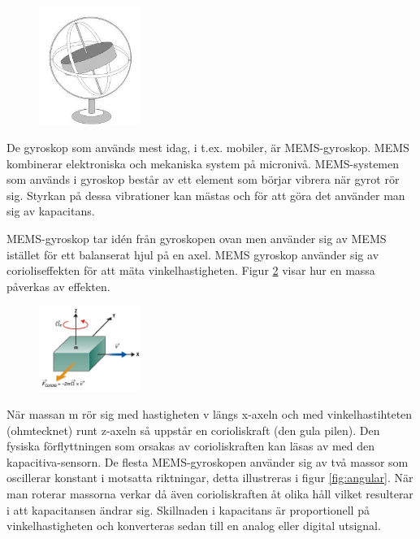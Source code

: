 \documentclass[a4paper,12pt,fleqn]{article}
\begin{document}
\begin{figure}[h]
\label{fig:gyro}
\caption{}
\includegraphics[width=0.3\textwidth]
{gyro.jpeg}
\end{figure}

De gyroskop som används mest idag, i t.ex. mobiler, är MEMS-gyroskop. MEMS kombinerar elektroniska och mekaniska system på micronivå. MEMS-systemen som används i gyroskop består av ett element som börjar vibrera när gyrot rör sig. Styrkan på dessa vibrationer kan mästas och för att göra det använder man sig av kapacitans.

MEMS-gyroskop tar idén från gyroskopen ovan men använder sig av MEMS istället för ett balanserat hjul på en axel. MEMS gyroskop använder sig av corioliseffekten för att mäta vinkelhastigheten. Figur \ref{fig:coriolis} visar hur en massa påverkas av effekten.
\begin{figure}[h]
\label{fig:coriolis}
\caption{}
\includegraphics[width=0.3\textwidth]
{coriolis.png}
\end{figure}


När massan m rör sig med hastigheten v längs x-axeln och med vinkelhastihteten (ohmtecknet) runt z-axeln så uppstår en corioliskraft (den gula pilen). Den fysiska förflyttningen som orsakas av corioliskraften kan läsas av med den kapacitiva-sensorn. De flesta MEMS-gyroskopen använder sig av två massor som oscillerar konstant i motsatta riktningar, detta illustreras i figur \ref{fig:angular}. När man roterar massorna verkar då även corioliskraften åt olika håll vilket resulterar i att kapacitansen ändrar sig. Skillnaden i kapacitans är proportionell på vinkelhastigheten och konverteras sedan till en analog eller digital utsignal.
\end{document}
